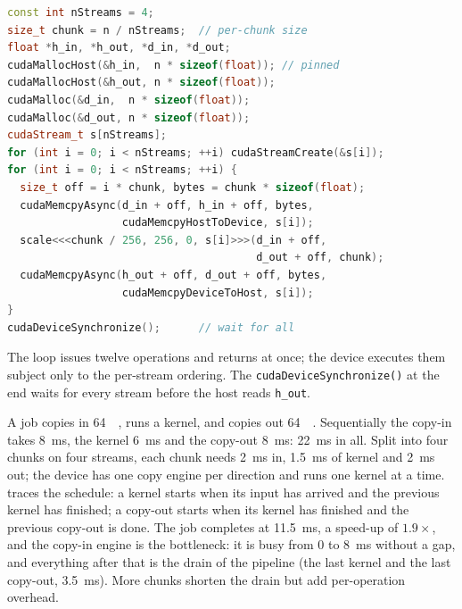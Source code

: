 \documentclass[../main.tex]{subfiles}
\begin{document}
\begin{lstlisting}[language=C++, numbers=none]
const int nStreams = 4;
size_t chunk = n / nStreams;  // per-chunk size
float *h_in, *h_out, *d_in, *d_out;
cudaMallocHost(&h_in,  n * sizeof(float)); // pinned
cudaMallocHost(&h_out, n * sizeof(float));
cudaMalloc(&d_in,  n * sizeof(float));
cudaMalloc(&d_out, n * sizeof(float));
cudaStream_t s[nStreams];
for (int i = 0; i < nStreams; ++i) cudaStreamCreate(&s[i]);
for (int i = 0; i < nStreams; ++i) {
  size_t off = i * chunk, bytes = chunk * sizeof(float);
  cudaMemcpyAsync(d_in + off, h_in + off, bytes,
                  cudaMemcpyHostToDevice, s[i]);
  scale<<<chunk / 256, 256, 0, s[i]>>>(d_in + off,
                                       d_out + off, chunk);
  cudaMemcpyAsync(h_out + off, d_out + off, bytes,
                  cudaMemcpyDeviceToHost, s[i]);
}
cudaDeviceSynchronize();      // wait for all
\end{lstlisting}
The loop issues twelve operations and returns at once; the device
executes them subject only to the per-stream ordering.  The
\texttt{cudaDeviceSynchronize()} at the end waits for every stream
before the host reads \texttt{h\_out}.

\begin{example}
  \label{ex:l05-pipeline}
  A job copies in \SI{64}{\mebi\byte}, runs a kernel, and copies out
  \SI{64}{\mebi\byte}.  Sequentially the copy-in takes
  \SI{8}{\milli\second}, the kernel \SI{6}{\milli\second} and the
  copy-out \SI{8}{\milli\second}: \SI{22}{\milli\second} in all.  Split
  into four chunks on four streams, each chunk needs \SI{2}{\milli\second}
  in, \SI{1.5}{\milli\second} of kernel and \SI{2}{\milli\second} out; the
  device has one copy engine per direction and runs one kernel at a time.
   traces the schedule: a kernel starts when its
  input has arrived and the previous kernel has finished; a copy-out
  starts when its kernel has finished and the previous copy-out is done.
  The job completes at \SI{11.5}{\milli\second}, a speed-up of $1.9\times$,
  and the copy-in engine is the bottleneck: it is busy from $0$ to
  \SI{8}{\milli\second} without a gap, and everything after that is the
  drain of the pipeline (the last kernel and the last copy-out,
  \SI{3.5}{\milli\second}).  More chunks shorten the drain but add
  per-operation overhead.
\end{example}
\end{document}
